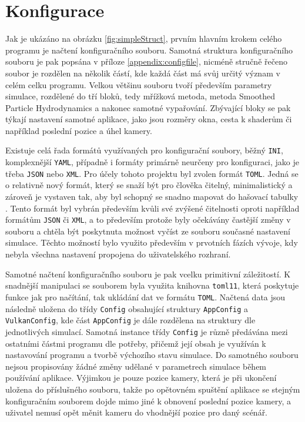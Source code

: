 \section{Konfigurace}
\label{chapter:konfigurace}
Jak je ukázáno na obrázku \ref{fig:simpleStruct}, prvním hlavním krokem celého programu je načtení konfiguračního souboru. Samotná struktura konfiguračního souboru je pak popsána v příloze \ref{appendix:configfile}, nicméně stručně řečeno soubor je rozdělen na několik částí, kde každá část má svůj určitý význam v celém celku programu. Velkou většinu souboru tvoří především parametry simulace, rozdělené do tří bloků, tedy mřížková metoda, metoda Smoothed Particle Hydrodynamics a nakonec samotné vypařování. Zbývající bloky se pak týkají nastavení samotné aplikace, jako jsou rozměry okna, cesta k shaderům či například poslední pozice a úhel kamery.

Existuje celá řada formátů využívaných pro konfigurační soubory, běžný \texttt{INI}, komplexnější \texttt{YAML}, případně i formáty primárně neurčeny pro konfiguraci, jako je třeba \texttt{JSON} nebo \texttt{XML}. Pro účely tohoto projektu byl zvolen formát \texttt{TOML}. Jedná se o relativně nový formát, který se snaží být pro člověka čitelný, minimalistický a zároveň je vystaven tak, aby byl schopný se snadno mapovat do hašovací tabulky \cite{toml-lang}. Tento formát byl vybrán především kvůli své zvýšené čitelnosti oproti například formátům \texttt{JSON} či \texttt{XML}, a to především protože byly očekávány častější změny v souboru a chtěla být poskytnuta možnost vyčíst ze souboru současné nastavení simulace. Těchto možností bylo využito především v prvotních fázích vývoje, kdy nebyla všechna nastavení propojena do uživatelského rozhraní.

Samotné načtení konfiguračního souboru je pak vcelku primitivní záležitostí. K snadnější manipulaci se souborem byla využita knihovna \texttt{toml11}, která poskytuje funkce jak pro načítání, tak ukládání dat ve formátu \texttt{TOML}. Načtená data jsou následně uložena do třídy \texttt{Config} obsahující struktury \texttt{AppConfig} a \texttt{VulkanConfig}, kde část \texttt{AppConfig} je dále rozdělena na struktury dle jednotlivých simulací. Samotná instance třídy \texttt{Config} je různě předávána mezi ostatními částmi programu dle potřeby, přičemž její obsah je využíván k nastavování programu a tvorbě výchozího stavu simulace. Do samotného souboru nejsou propisovány žádné změny udělané v parametrech simulace během používání aplikace. Výjimkou je pouze pozice kamery, která je při ukončení uložena do příslušného souboru, takže po opětovném spuštění aplikace se stejným konfiguračním souborem dojde mimo jiné k obnovení poslední pozice kamery, a uživatel nemusí opět měnit kameru do vhodnější pozice pro daný scénář.

